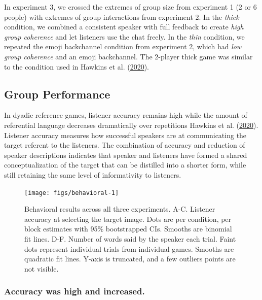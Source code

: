 \documentclass[
  english,
  a4paper,
]{article}
\begin{document}
In experiment 3, we crossed the extremes of group size from experiment 1 (2 or 6 people) with extremes of group interactions from experiment 2. In the \emph{thick} condition, we combined a consistent speaker with full feedback to create \emph{high group coherence} and let listeners use the chat freely. In the \emph{thin} condition, we repeated the emoji backchannel condition from experiment 2, which had \emph{low group coherence} and an emoji backchannel. The 2-player thick game was similar to the condition used in Hawkins et al. (\protect\hyperlink{ref-hawkins2020}{2020}).

\hypertarget{group-performance}{%
\subsection{Group Performance}\label{group-performance}}

In dyadic reference games, listener accuracy remains high while the amount of referential language decreases dramatically over repetitions Hawkins et al. (\protect\hyperlink{ref-hawkins2020}{2020}). Listener accuracy measures how successful speakers are at communicating the target referent to the listeners. The combination of accuracy and reduction of speaker descriptions indicates that speaker and listeners have formed a shared conceptualization of the target that can be distilled into a shorter form, while still retaining the same level of informativity to listeners.

\begin{figure}[t!]

{\centering \texttt{[image: figs/behavioral-1]} 

}

\caption{Behavioral results across all three experiments. A-C. Listener accuracy at selecting the target image. Dots are per condition, per block estimates with 95\% bootstrapped CIs. Smooths are binomial fit lines.   D-F. Number of words said by the speaker each trial. Faint dots represent individual trials from individual games. Smooths are quadratic fit lines. Y-axis is truncated, and a few outliers points are not visible. }\label{fig:behavioral}
\end{figure}

\hypertarget{accuracy-was-high-and-increased.}{%
\subsubsection{Accuracy was high and increased.}\label{accuracy-was-high-and-increased.}}
\end{document}
